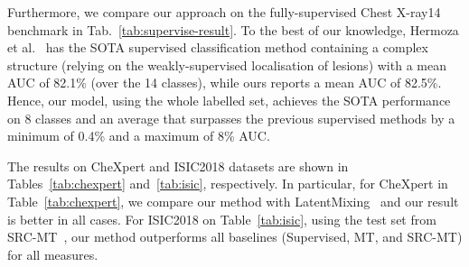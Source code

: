 \documentclass[runningheads]{llncs}
\begin{document}
 Furthermore, we compare our approach on the fully-supervised Chest X-ray14 benchmark in Tab.~\ref{tab:supervise-result}. To the best of our knowledge, Hermoza et al.~\cite{hermoza2020region} has the SOTA supervised classification method containing a complex structure (relying on the weakly-supervised localisation of lesions) with a mean AUC of 82.1\% (over the 14 classes), while ours reports a mean AUC of 82.5\%. Hence, our model, using the whole labelled set, achieves the SOTA performance on 8 classes and an average that surpasses the previous supervised methods by a minimum of 0.4\% and a maximum of 8\% AUC. 





The results on CheXpert and ISIC2018 datasets 
are shown in Tables~\ref{tab:chexpert} and~\ref{tab:isic}, respectively.
In particular, for CheXpert in Table~\ref{tab:chexpert}, we compare our method with LatentMixing~\cite{gyawali2020semi} and our result is better in all cases. For ISIC2018 on Table~\ref{tab:isic}, using the test set from SRC-MT~\cite{liu2020semi}, our method outperforms all baselines (Supervised, MT, and SRC-MT) for all measures. 







\begin{table}[t!]
\centering
{}
\caption{Mean AUC result over the 14 disease classes of Chest X-Ray14 for different label set training percentages. * indicates the methods that use Densenet169 as backbone architecture. \vspace{-.1in}}
\label{tab:main}
\end{table}
\end{document}
